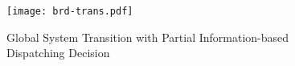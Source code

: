 \begin{figure}[ht]
    \centering
    \texttt{[image: brd-trans.pdf]}
    \caption{Global System Transition with Partial Information-based Dispatching Decision}
    \label{fig:brd-trans}
\end{figure}

        
